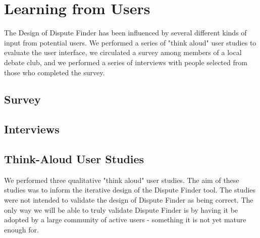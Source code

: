 \documentclass{www2010-submission}
\newcommand{\todo}[1]{}
\begin{document}
\todo{Mention that we could add the +ve and -ve n-grams to the client code? Actually do this?}

\todo{Discuss how and why this is simpler than the server-side classification method}
\todo{Explain how we avoid downloading the entire database}

\todo{Should we have a version where the interface merely suggests n-grams that should be used by the classifier}
\todo{Can we present all these systems without giving detailed stats about how they compare?}
\todo{Add support for a user to enter 'anti-phrases' when a snippet is wrongly highlighted}
\todo{Add support for a user to enter a paraphrase that will match the snippet they are looking at}
\todo{Do a load more people in a final user-study round. Try to get it up to 8.}
\todo{Explain how our algorithm relates to existing NLP work - due to unusual domain}


\section{Learning from Users}

The Design of Dispute Finder has been influenced by several different kinds of input from potential users. We performed a series of "think aloud" user studies to evaluate the user interface, we circulated a survey among members of a local debate club, and we performed a series of interviews with people selected from those who completed the survey.

\subsection{Survey}

\subsection{Interviews}

\subsection{Think-Aloud User Studies}

We performed three qualitative "think aloud" user studies. The aim of these studies was to inform the iterative design of the Dispute Finder tool. The studies were not intended to validate the design of Dispute Finder as being correct. The only way we will be able to truly validate Dispute Finder is by having it be adopted by a large community of active users - something it is not yet mature enough for.
\end{document}
